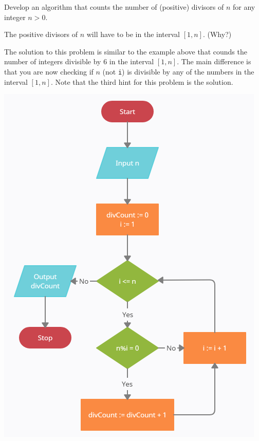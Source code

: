 \documentclass{ximera}
\begin{document}
\begin{question}
	Develop an algorithm that counts the number of (positive) divisors of $n$ for any integer $n>0$. 
	\begin{hint}
		The positive divisors of $n$ will have to be in the interval $[1,n]$. (Why?)
	\end{hint}
	\begin{hint}
		The solution to this problem is similar to the example above that counds the number of integers divisible by 6 in the interval $[1,n]$. The main difference is that you are now checking if $n$ (not \verb|i|) is divisible by any of the numbers in the interval $[1,n]$. Note that the third hint for this problem is the solution.
	\end{hint}

	\begin{hint}
	\begin{center}
		\includegraphics{divcount.png}
	\end{center}
	\end{hint}
\end{question}
\end{document}
